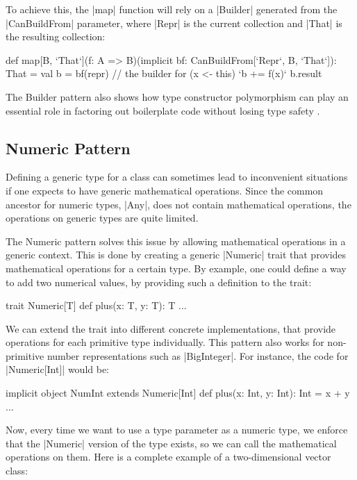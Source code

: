 To achieve this, the |map| function will rely on a |Builder| generated from the |CanBuildFrom| parameter, where |Repr| is the current collection and |That| is the resulting collection:

\begin{lstlisting-nobreak}
  def map[B, `That`](f: A => B)(implicit bf: CanBuildFrom[`Repr`, B, `That`]): That = {
    val b = bf(repr) // the builder
    for (x <- this)
      `b += f(x)`
    b.result
  }
\end{lstlisting-nobreak}



The Builder pattern also shows how type constructor polymorphism can play an essential role in factoring out boilerplate code without losing type safety \cite{adriaan}.

\subsection{Numeric Pattern}

Defining a generic type for a class can sometimes lead to inconvenient situations if one expects to have generic mathematical operations. Since the common ancestor for numeric types, |Any|, does not contain mathematical operations, the operations on generic types are quite limited.

The Numeric pattern solves this issue by allowing  mathematical operations in a generic context. This is done by creating a generic |Numeric| trait that provides mathematical operations for a certain type. By example, one could define a way to add two numerical values, by providing such a definition to the trait:

\begin{lstlisting-nobreak}
 trait Numeric[T] {
   def plus(x: T, y: T): T
   ...
 }
\end{lstlisting-nobreak}

We can extend the trait into different concrete implementations, that provide operations for each primitive type individually. This pattern also works for non-primitive number representations such as |BigInteger|. For instance, the code for |Numeric[Int]| would be:

\begin{lstlisting-nobreak}
 implicit object NumInt extends Numeric[Int] {
   def plus(x: Int, y: Int): Int = x + y
   ...
 }
\end{lstlisting-nobreak}

Now, every time we want to use a type parameter as a numeric type, we enforce that the |Numeric| version of the type exists, so we can call the mathematical operations on them. Here is a complete example of a two-dimensional vector class:

